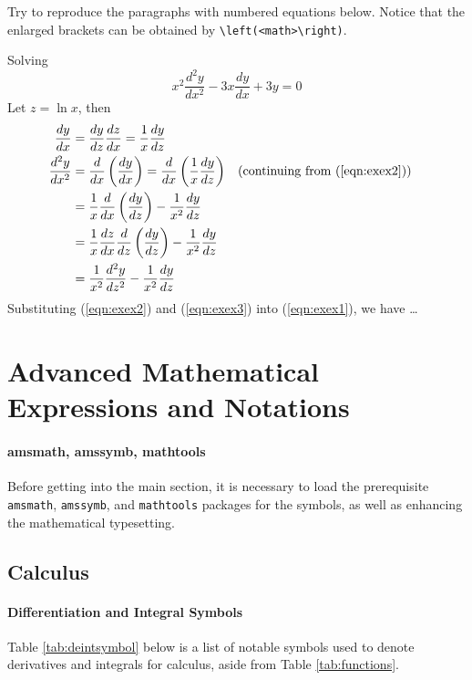 \begin{exercisebox}[nobreak=false]
\begin{Exercise}
Try to reproduce the paragraphs with numbered equations below. Notice that the enlarged brackets can be obtained by \texttt{\textbackslash left(<math>\textbackslash right)}.

Solving
\begin{equation}
x^2\frac{d^2y}{dx^2} - 3x\frac{dy}{dx} + 3y = 0 \label{eqn:exex1}
\end{equation} 
Let $z = \ln x$, then
\begin{align}
\frac{dy}{dx} &= \frac{dy}{dz}\frac{dz}{dx} = \frac{1}{x}\frac{dy}{dz} \label{eqn:exex2} \\
\frac{d^2y}{dx^2} &= \frac{d}{dx}\left(\frac{dy}{dx}\right) = \frac{d}{dx}\left(\frac{1}{x}\frac{dy}{dz}\right) && (\text{continuing from (\ref{eqn:exex2})}) \nonumber \\
&= \frac{1}{x}\frac{d}{dx}\left(\frac{dy}{dz}\right) - \frac{1}{x^2}\frac{dy}{dz} \nonumber \\
&= \frac{1}{x}\frac{dz}{dx}\frac{d}{dz}\left(\frac{dy}{dz}\right) - \frac{1}{x^2}\frac{dy}{dz} \nonumber \\
&= \frac{1}{x^2}\frac{d^2y}{dz^2} - \frac{1}{x^2}\frac{dy}{dz} \label{eqn:exex3}
\end{align}
Substituting (\ref{eqn:exex2}) and (\ref{eqn:exex3}) into (\ref{eqn:exex1}), we have \ldots
\end{Exercise} 
\end{exercisebox}

\section{Advanced Mathematical Expressions and Notations}

\paragraph{amsmath, amssymb, mathtools}
Before getting into the main section, it is necessary to load the prerequisite \verb|amsmath|, \verb|amssymb|, and \verb|mathtools| packages for the symbols, as well as enhancing the mathematical typesetting.

\subsection{Calculus}

\paragraph{Differentiation and Integral Symbols}
Table \ref{tab:deintsymbol} below is a list of notable symbols used to denote derivatives and integrals for calculus, aside from Table \ref{tab:functions}.

